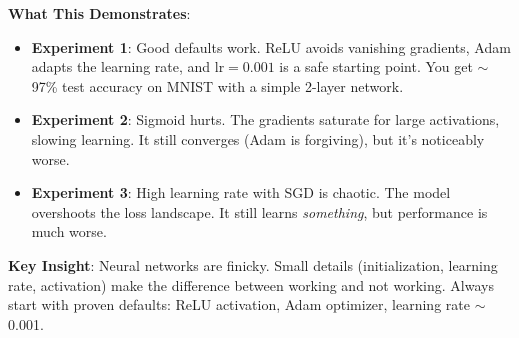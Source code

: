 \textbf{What This Demonstrates}:
\begin{itemize}
    \item \textbf{Experiment 1}: Good defaults work. ReLU avoids vanishing gradients, Adam adapts the learning rate, and $\text{lr}=0.001$ is a safe starting point. You get $\sim$97\% test accuracy on MNIST with a simple 2-layer network.
    \item \textbf{Experiment 2}: Sigmoid hurts. The gradients saturate for large activations, slowing learning. It still converges (Adam is forgiving), but it's noticeably worse.
    \item \textbf{Experiment 3}: High learning rate with SGD is chaotic. The model overshoots the loss landscape. It still learns \textit{something}, but performance is much worse.
\end{itemize}

\begin{insightbox}
\textbf{Key Insight}: Neural networks are finicky. Small details (initialization, learning rate, activation) make the difference between working and not working. Always start with proven defaults: ReLU activation, Adam optimizer, learning rate $\sim$0.001.
\end{insightbox}
